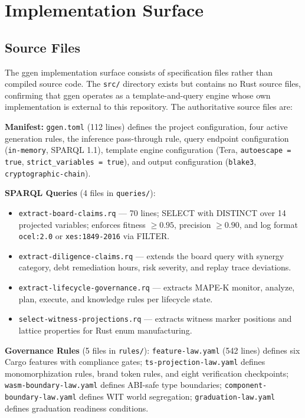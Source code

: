 
\section{Implementation Surface}
\label{sec:ggen-implementation}

\subsection{Source Files}
\label{sec:ggen-implementation-source}

The ggen implementation surface consists of specification files rather than compiled source code.
The \texttt{src/} directory exists but contains no Rust source files, confirming that ggen
operates as a template-and-query engine whose own implementation is external to this repository.
The authoritative source files are:

\textbf{Manifest:} \texttt{ggen.toml} (112 lines) defines the project configuration, four
active generation rules, the inference pass-through rule, query endpoint configuration
(\texttt{in-memory}, SPARQL 1.1), template engine configuration (Tera, \texttt{autoescape = true},
\texttt{strict\_variables = true}), and output configuration (\texttt{blake3},
\texttt{cryptographic-chain}).

\textbf{SPARQL Queries} (4 files in \texttt{queries/}):
\begin{itemize}
  \item \texttt{extract-board-claims.rq} --- 70 lines; SELECT with DISTINCT over 14 projected
    variables; enforces fitness $\geq 0.95$, precision $\geq 0.90$, and log format
    \texttt{ocel:2.0} or \texttt{xes:1849-2016} via FILTER.
  \item \texttt{extract-diligence-claims.rq} --- extends the board query with synergy category,
    debt remediation hours, risk severity, and replay trace deviations.
  \item \texttt{extract-lifecycle-governance.rq} --- extracts MAPE-K monitor, analyze, plan,
    execute, and knowledge rules per lifecycle state.
  \item \texttt{select-witness-projections.rq} --- extracts witness marker positions and lattice
    properties for Rust enum manufacturing.
\end{itemize}

\textbf{Governance Rules} (5 files in \texttt{rules/}): \texttt{feature-law.yaml} (542 lines)
defines six Cargo features with compliance gates; \texttt{ts-projection-law.yaml} defines
monomorphization rules, brand token rules, and eight verification checkpoints;
\texttt{wasm-boundary-law.yaml} defines ABI-safe type boundaries; \texttt{component-boundary-law.yaml}
defines WIT world segregation; \texttt{graduation-law.yaml} defines graduation readiness
conditions.

